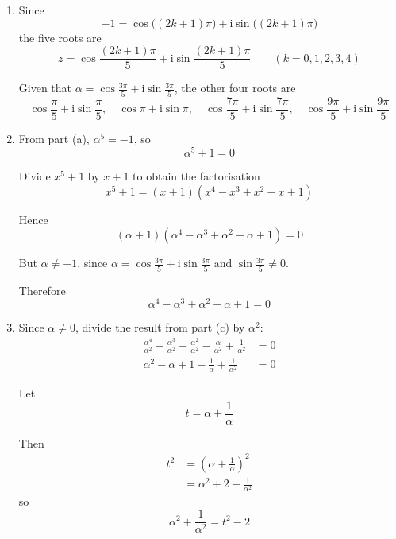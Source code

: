 \documentclass[leqno]{article}
\begin{document}
\begin{enumerate}[
  label=\textbf{\arabic*.},
  leftmargin=*,
  topsep=0pt,
  partopsep=0pt,
  parsep=0pt
]
\begin{tcolorbox}[colback=white, colframe=scarlet, title={\textbf{Solution}}, breakable, grow to left by=6mm, grow to right by=10mm]
\begin{enumerate}[label=\textbf{(\alph*)}]
Using De Moivre's theorem,
\begin{align*}
\alpha^5
&=\cos\left(5\cdot\frac{3\pi}{5}\right)+\mathrm{i}\sin\left(5\cdot\frac{3\pi}{5}\right) \\
&=\cos 3\pi+\mathrm{i}\sin 3\pi \\
&=-1+0\mathrm{i} \\
&=-1
\end{align*}

So $\alpha$ satisfies $z^5=-1$, and hence $\alpha$ is a root of the equation.

  \item Since
\[
-1=\cos\bigl((2k+1)\pi\bigr)+\mathrm{i}\sin\bigl((2k+1)\pi\bigr)
\]
the five roots are
\[
z=\cos\frac{(2k+1)\pi}{5}+\mathrm{i}\sin\frac{(2k+1)\pi}{5}
\qquad (k=0,1,2,3,4)
\]

Given that $\alpha=\cos\frac{3\pi}{5}+\mathrm{i}\sin\frac{3\pi}{5}$, the other four roots are
\[
\cos\frac{\pi}{5}+\mathrm{i}\sin\frac{\pi}{5},\quad
\cos\pi+\mathrm{i}\sin\pi,\quad
\cos\frac{7\pi}{5}+\mathrm{i}\sin\frac{7\pi}{5},\quad
\cos\frac{9\pi}{5}+\mathrm{i}\sin\frac{9\pi}{5}
\]

  \item From part (a), $\alpha^5=-1$, so
\[
\alpha^5+1=0
\]

Divide $x^5+1$ by $x+1$ to obtain the factorisation
\[
x^5+1=(x+1)(x^4-x^3+x^2-x+1)
\]

Hence
\[
(\alpha+1)(\alpha^4-\alpha^3+\alpha^2-\alpha+1)=0
\]

But $\alpha\ne -1$, since $\alpha=\cos\frac{3\pi}{5}+\mathrm{i}\sin\frac{3\pi}{5}$ and $\sin\frac{3\pi}{5}\ne 0$.

Therefore
\[
\alpha^4-\alpha^3+\alpha^2-\alpha+1=0
\]

  \item Since $\alpha\neq 0$, divide the result from part (c) by $\alpha^2$:
\begin{align*}
\frac{\alpha^4}{\alpha^2}-\frac{\alpha^3}{\alpha^2}+\frac{\alpha^2}{\alpha^2}-\frac{\alpha}{\alpha^2}+\frac{1}{\alpha^2}&=0 \\
\alpha^2-\alpha+1-\frac{1}{\alpha}+\frac{1}{\alpha^2}&=0
\end{align*}

Let
\[
t=\alpha+\frac{1}{\alpha}
\]

Then
\begin{align*}
t^2
&=\left(\alpha+\frac{1}{\alpha}\right)^2 \\
&=\alpha^2+2+\frac{1}{\alpha^2}
\end{align*}
so
\[
\alpha^2+\frac{1}{\alpha^2}=t^2-2
\]


\end{enumerate}
\end{tcolorbox}
\end{enumerate}
\end{document}
